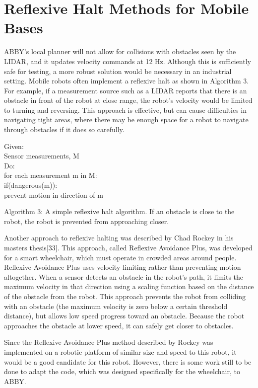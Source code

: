 \documentclass[]{cwru} %
\begin{document}
\section{Reflexive Halt Methods for Mobile Bases}

ABBY's local planner will not allow for collisions with obstacles seen
by the LIDAR, and it updates velocity commands at 12 Hz. Although this
is sufficiently safe for testing, a more robust solution would be
necessary in an industrial setting. Mobile robots often implement a
reflexive halt as shown in Algorithm 3. For example, if a measurement
source such as a LIDAR reports that there is an obstacle in front of the
robot at close range, the robot's velocity would be limited to turning
and reversing. This approach is effective, but can cause difficulties in
navigating tight areas, where there may be enough space for a robot to
navigate through obstacles if it does so carefully.

Given:\\ Sensor measurements, M\\Do:\\ for each measurement m in M:\\
if(dangerous(m)):\\ prevent motion in direction of m

Algorithm 3: A simple reflexive halt
algorithm. If an obstacle is close to the robot, the robot is prevented
from approaching closer.

Another approach to reflexive halting was described by Chad Rockey in
his masters thesis{[}33{]}. This approach, called Reflexive Avoidance
Plus, was developed for a smart wheelchair, which must operate in
crowded areas around people. Reflexive Avoidance Plus uses velocity
limiting rather than preventing motion altogether. When a sensor detects
an obstacle in the robot's path, it limits the maximum velocity in that
direction using a scaling function based on the distance of the obstacle
from the robot. This approach prevents the robot from colliding with an
obstacle (the maximum velocity is zero below a certain threshold
distance), but allows low speed progress toward an obstacle. Because the
robot approaches the obstacle at lower speed, it can safely get closer
to obstacles.

Since the Reflexive Avoidance Plus method described by Rockey was
implemented on a robotic platform of similar size and speed to this
robot, it would be a good candidate for this robot. However, there is
some work still to be done to adapt the code, which was designed
specifically for the wheelchair, to ABBY.
\end{document}
